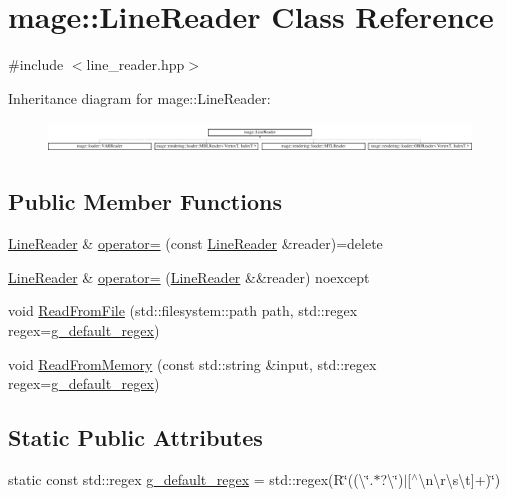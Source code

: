 \hypertarget{classmage_1_1_line_reader}{}\section{mage\+:\+:Line\+Reader Class Reference}
\label{classmage_1_1_line_reader}


{\ttfamily \#include $<$line\+\_\+reader.\+hpp$>$}

Inheritance diagram for mage\+:\+:Line\+Reader\+:\begin{figure}[H]
\begin{center}
\leavevmode
\includegraphics[height=0.821114cm]{classmage_1_1_line_reader}
\end{center}
\end{figure}
\subsection*{Public Member Functions}
\begin{DoxyCompactItemize}
\item 
\mbox{\hyperlink{classmage_1_1_line_reader}{Line\+Reader}} \& \mbox{\hyperlink{classmage_1_1_line_reader_a2247078d0b5602f9a9a6b74019832faf}{operator=}} (const \mbox{\hyperlink{classmage_1_1_line_reader}{Line\+Reader}} \&reader)=delete
\item 
\mbox{\hyperlink{classmage_1_1_line_reader}{Line\+Reader}} \& \mbox{\hyperlink{classmage_1_1_line_reader_a3ba691cb32a1ab5dcbe75498068c1b86}{operator=}} (\mbox{\hyperlink{classmage_1_1_line_reader}{Line\+Reader}} \&\&reader) noexcept
\item 
void \mbox{\hyperlink{classmage_1_1_line_reader_ac819910b2ad9cf9751fa223d4f90ada0}{Read\+From\+File}} (std\+::filesystem\+::path path, std\+::regex regex=\mbox{\hyperlink{classmage_1_1_line_reader_a6b21fad06278a64bbdece198844a8cfa}{g\+\_\+default\+\_\+regex}})
\item 
void \mbox{\hyperlink{classmage_1_1_line_reader_adc2bf81611774d4a11da47812fcc0f6a}{Read\+From\+Memory}} (const std\+::string \&input, std\+::regex regex=\mbox{\hyperlink{classmage_1_1_line_reader_a6b21fad06278a64bbdece198844a8cfa}{g\+\_\+default\+\_\+regex}})
\end{DoxyCompactItemize}
\subsection*{Static Public Attributes}
\begin{DoxyCompactItemize}
\item 
static const std\+::regex \mbox{\hyperlink{classmage_1_1_line_reader_a6b21fad06278a64bbdece198844a8cfa}{g\+\_\+default\+\_\+regex}} = std\+::regex(R\char`\"{}((\textbackslash{}\char`\"{}.$\ast$?\textbackslash{}\char`\"{})$\vert$\mbox{[}$^\wedge$\textbackslash{}n\textbackslash{}r\textbackslash{}s\textbackslash{}t\mbox{]}+)\char`\"{})
\end{DoxyCompactItemize}
